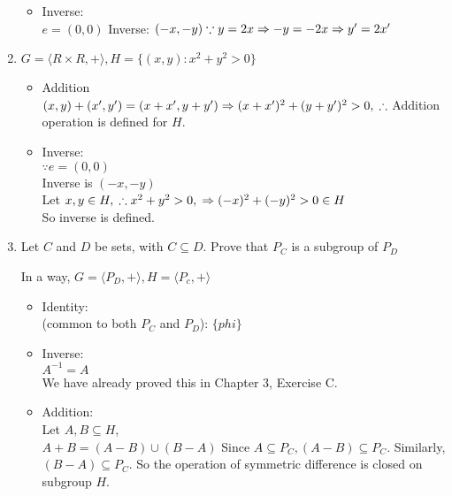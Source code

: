 \documentclass[12pt]{article}
\begin{document}
\begin{enumerate}
\begin{itemize}
    \item 
      Inverse: \\
      $e = (0,0)$ 
      Inverse: $(-x, -y) \\
      \because y = 2x \\
      \Rightarrow -y = -2x \\
      \Rightarrow y' = 2x'$

  \end{itemize}

\item $G = \langle R \times  R, + \rangle, H = \{(x,y) : x^{2} + y^{2} > 0\}$

  \begin{itemize}
    \item 
      Addition \\
      $(x,y) + (x',y') = (x + x', y+y') \\
      \Rightarrow (x+x')^{2} + (y+y')^{2} > 0, \\
      \therefore$ Addition operation is defined for $H$.
      
    \item
      Inverse: \\
      $\because e = (0,0)$ \\
      Inverse is $(-x, -y)$ \\
      Let $x, y \in H, \\
      \therefore x^{2} + y^{2} > 0, \\
      \Rightarrow (-x)^{2} + (-y)^{2} > 0 \in H$ \\
      So inverse is defined.

  \end{itemize}

\item Let $C$ and $D$ be sets, with $C \subseteq D$. Prove that $P_C$ is a subgroup of $P_D$

  In a way, $G = \langle P_D , + \rangle, H = \langle P_c , + \rangle$
  
\begin{itemize}
  \item 
    Identity: \\ (common to both $P_C$ and $P_D$): $\{phi\}$
  \item 
    Inverse: \\
    $A^{-1} = A$ \\
    We have already proved this in Chapter 3, Exercise C.
  \item 
    Addition: \\
    Let $A, B \subseteq H$, \\
    $A + B = (A - B) \cup (B - A)$
    Since $A \subseteq P_C, (A - B) \subseteq P_C$. Similarly, $(B - A) \subseteq P_C$. So the operation of symmetric difference is closed on subgroup $H$. 

\end{itemize}

  \end{enumerate}
\end{document}
